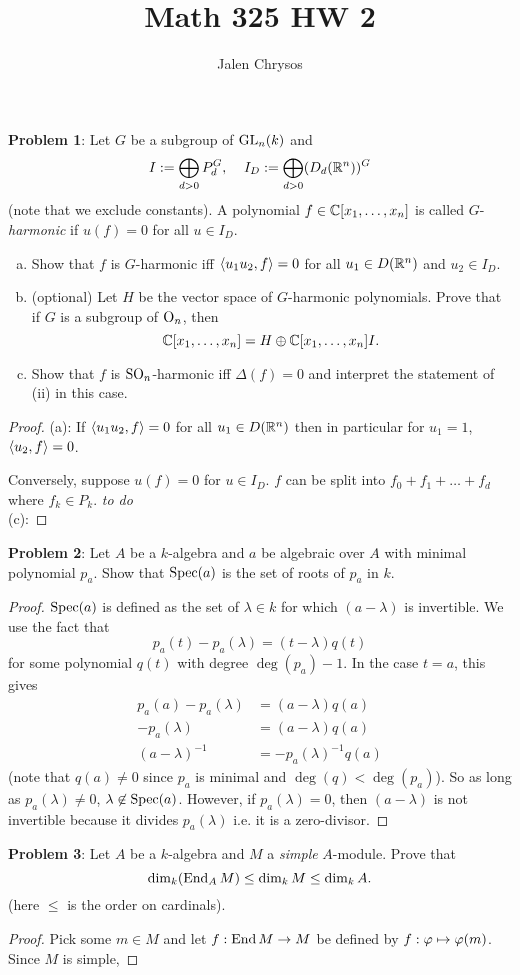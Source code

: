 \documentclass{amsart}
\title{Math 325 HW 2}
\author{Jalen Chrysos}
\begin{document}
	
\noindent\textbf{Problem 1}: Let $G$ be a subgroup of $\operatorname{GL}_n(k)$ and 
	$$
	I := \bigoplus_{d>0} P_d^G, \;\;\;\; I_D := \bigoplus_{d>0} (D_d(\mathbb{R}^n))^G
	$$
	(note that we exclude constants). A polynomial $f\in \mathbb{C}[x_1,\dots,x_n]$ is called $G$-\textit{harmonic} if $u(f)=0$ for all $u\in I_D$.
	\begin{enumerate}[(a)]
		\item Show that $f$ is $G$-harmonic iff $\langle u_1u_2,f\rangle=0$ for all $u_1\in D(\mathbb{R}^n)$ and $u_2\in I_D$.
		\item (optional) Let $H$ be the vector space of $G$-harmonic polynomials. Prove that if $G$ is a subgroup of $\mathrm{O}_n$, then 
		$$
		\mathbb{C}[x_1,\dots,x_n] = H\oplus \mathbb{C}[x_1,\dots,x_n]I.
		$$
		\item Show that $f$ is $\operatorname{SO}_n$-harmonic iff $\Delta(f)=0$ and interpret the statement of (ii) in this case.
	\end{enumerate}
	
	\begin{proof}
		(a): If $\langle u_1u_2,f\rangle=0$ for all $u_1\in D(\mathbb{R}^n)$ then in particular for $u_1=1$, $\langle u_2,f\rangle=0$.
		
		Conversely, suppose $u(f)=0$ for $u\in I_D$. $f$ can be split into $f_0+f_1+\dots+f_d$ where $f_k\in P_k$. \textit{to do}\\
		
		(c):  
	\end{proof}
	
\newpage 

\noindent\textbf{Problem 2}: Let $A$ be a $k$-algebra and $a$ be algebraic over $A$ with minimal polynomial $p_a$. Show that $\operatorname{Spec}(a)$ is the set of roots of $p_a$ in $k$. 

\begin{proof}
	$\operatorname{Spec}(a)$ is defined as the set of $\lambda \in k$ for which $(a-\lambda)$ is invertible. We use the fact that 
	$$
	p_a(t) - p_a(\lambda) = (t-\lambda)q(t)
	$$
	for some polynomial $q(t)$ with degree $\deg(p_a)-1$. In the case $t=a$, this gives
	\begin{align*}
	p_a(a) - p_a(\lambda) &= (a-\lambda)q(a) \\
	 -p_a(\lambda) &= (a-\lambda)q(a)\\
	 (a-\lambda)^{-1} &= -p_a(\lambda)^{-1}q(a)
	\end{align*}
	(note that $q(a)\neq 0$ since $p_a$ is minimal and $\deg(q)<\deg(p_a)$). So as long as $p_a(\lambda)\neq 0$, $\lambda \not\in \operatorname{Spec}(a)$. However, if $p_a(\lambda)=0$, then $(a-\lambda)$ is not invertible because it divides $p_a(\lambda)$ i.e. it is a zero-divisor.
\end{proof}

\newpage
\noindent \textbf{Problem 3}: Let $A$ be a $k$-algebra and $M$ a \textit{simple} $A$-module. Prove that 
$$\dim_k(\operatorname{End}_A M) \leq \dim_k M \leq \dim_k A.$$
(here $\leq$ is the order on cardinals).

\begin{proof}
	Pick some $m\in M$ and let $f:\operatorname{End} M \to M$ be defined by $f:\varphi\mapsto \varphi(m)$. Since $M$ is simple, 
\end{proof}
\end{document}
